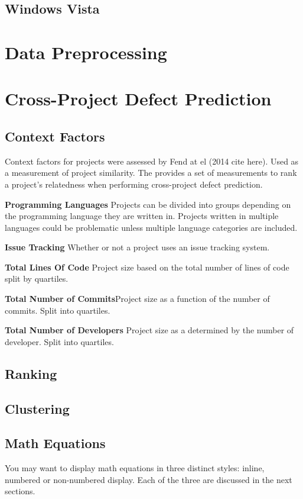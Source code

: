 \documentclass{sig-alternate-05-2015}
\begin{document}
\subsection{Windows Vista}

\section{Data Preprocessing}

\section{Cross-Project Defect Prediction}

\subsection{Context Factors}
Context factors for projects were assessed by Fend at el (2014 cite here). Used as a measurement of project similarity. The provides a set of measurements to rank a project's relatedness when performing cross-project defect prediction.

\textbf{Programming Languages} Projects can be divided into groups depending on the programming language they are written in. Projects written in multiple languages could be problematic unless multiple language categories are included.

\textbf{Issue Tracking} Whether or not a project uses an issue tracking system.

\textbf{Total Lines Of Code} Project size based on the total number of lines of code split by quartiles.

\textbf{Total Number of Commits}Project size as a function of the number of commits. Split into quartiles.

\textbf{Total Number of Developers} Project size as a determined by the number of developer. Split into quartiles.

\subsection{Ranking}

\subsection{Clustering}



\subsection{Math Equations}
You may want to display math equations in three distinct styles:
inline, numbered or non-numbered display.  Each of
the three are discussed in the next sections.
\end{document}
